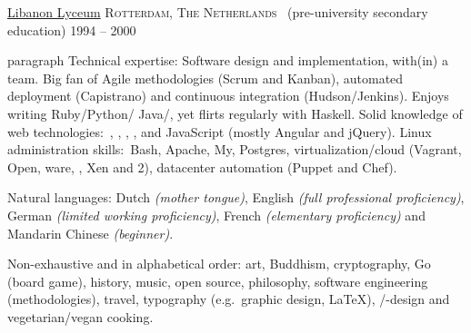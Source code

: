 \documentclass[10pt,a4paper]{article}
\begin{document}
\headedsection
  {\href{http://www.libanonlyceum.nl}{Libanon Lyceum}}
  {\textsc{Rotterdam, The Netherlands}} {%
  \headedsubsection
    { \textnormal{~(pre-university secondary education)}}
    {1994 -- 2000} {}
}


\spacedhrule{0.5em}{-0.4em}


\inlineheadsection  %
paragraph
  {Technical expertise:}
  {Software design and implementation, with(in) a team.  Big fan of Agile
methodologies (Scrum and Kanban), automated deployment (Capistrano) and
continuous integration (Hudson/Jenkins).  Enjoys writing Ruby/\nsp Python/\nsp
Java/\nsp \CPP, yet flirts regularly with Haskell.  Solid knowledge of web
technologies:\ , , , ,  and
JavaScript (mostly Angular and jQuery).  Linux administration skills:\ Bash,
Apache, My, Postgres, virtualization/cloud (Vagrant,
Open, ware, , Xen and 2), datacenter automation
(Puppet and Chef).}

\vspace{0.5em}
\inlineheadsection
  {Natural languages:}
  {Dutch \emph{(mother tongue)}, English \emph{(full professional proficiency)},
German \emph{(limited working proficiency)}, French \emph{(elementary
proficiency)} and Mandarin Chinese \emph{(beginner)}.}


\spacedhrule{1.6em}{-0.4em}


\inlineheadsection
  {Non-exhaustive and in alphabetical order:}
  {art, Buddhism, cryptography, Go (board game), history, music, open source,
philosophy, software engineering (methodologies), travel, typography (e.g.\
graphic design, \LaTeX), /-design and vegetarian/vegan cooking.}
\end{document}
